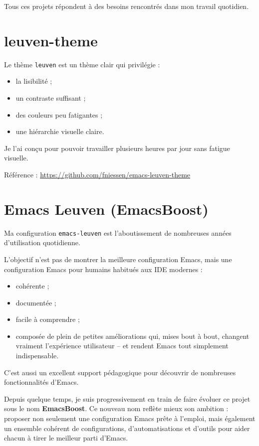 \documentclass{mcreport}
\begin{document}
Tous ces projets répondent à des besoins rencontrés dans mon travail quotidien.
\chapter{leuven-theme}
\label{sec:org40203cc}

Le thème \verb|leuven| est un thème clair qui privilégie :

\begin{itemize}
\item la lisibilité ;
\item un contraste suffisant ;
\item des couleurs peu fatigantes ;
\item une hiérarchie visuelle claire.
\end{itemize}

Je l'ai conçu pour pouvoir travailler plusieurs heures par jour sans fatigue
visuelle.

Référence : \url{https://github.com/fniessen/emacs-leuven-theme}
\chapter{Emacs Leuven (EmacsBoost)}
\label{sec:orgb911a05}

Ma configuration \verb|emacs-leuven| est l'aboutissement de nombreuses années
d'utilisation quotidienne.

L'objectif n'est pas de montrer \og la meilleure configuration Emacs\fg{}, mais une
configuration \og Emacs pour humains habitués aux IDE modernes\fg{} :

\begin{itemize}
\item cohérente ;
\item documentée ;
\item facile à comprendre ;
\item composée de plein de petites améliorations qui, mises bout à bout, changent
vraiment l'expérience utilisateur -- et rendent Emacs tout simplement
indispensable.
\end{itemize}

C'est aussi un excellent support pédagogique pour découvrir de nombreuses
fonctionnalités d'Emacs.

\begin{note}
Depuis quelque temps, je suis progressivement en train de faire évoluer ce
projet sous le nom \textbf{EmacsBoost}. Ce nouveau nom reflète mieux son ambition :
proposer non seulement une configuration Emacs prête à l'emploi, mais également
un ensemble cohérent de configurations, d'automatisations et d'outils pour aider
chacun à tirer le meilleur parti d'Emacs.
\end{note}
\end{document}

